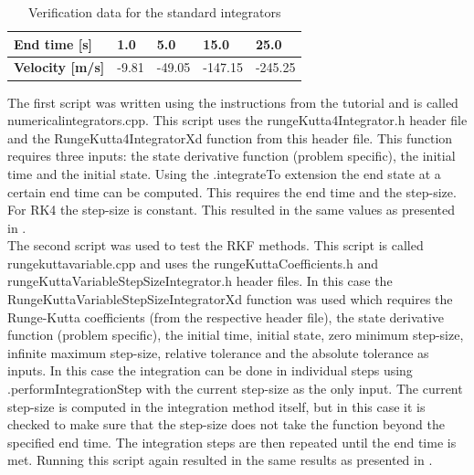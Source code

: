 \begin{table}[H]
\begin{center}
\caption{Verification data for the standard integrators}
\label{tab:intverdat}
\begin{tabular}{|l|l|l|l|l|}
\hline 
\textbf{End time [s]} & 1.0	& 5.0 & 15.0 & 25.0 \\ \hline 
\textbf{Velocity [m/s]} & -9.81 & -49.05 & -147.15 & -245.25 \\ \hline
\end{tabular}
\end{center}
\end{table}

\noindent
The first script was written using the instructions from the tutorial and is called numericalintegrators.cpp. This script uses the rungeKutta4Integrator.h header file and the RungeKutta4IntegratorXd function from this header file. This function requires three inputs: the state derivative function (problem specific), the initial time and the initial state. Using the .integrateTo extension the end state at a certain end time can be computed. This requires the end time and the step-size. For \ac{RK4} the step-size is constant. This resulted in the same values as presented in .\\

\noindent
The second script was used to test the \ac{RKF} methods. This script is called rungekuttavariable.cpp and uses the rungeKuttaCoefficients.h and rungeKuttaVariableStepSizeIntegrator.h header files. In this case the RungeKuttaVariableStepSizeIntegratorXd function was used which requires the Runge-Kutta coefficients (from the respective header file), the state derivative function (problem specific), the initial time, initial state, zero minimum step-size, infinite maximum step-size, relative tolerance and the absolute tolerance as inputs. In this case the integration can be done in individual steps using .performIntegrationStep with the current step-size as the only input. The current step-size is computed in the integration method itself, but in this case it is checked to make sure that the step-size does not take the function beyond the specified end time. The integration steps are then repeated until the end time is met. Running this script again resulted in the same results as presented in . \\

